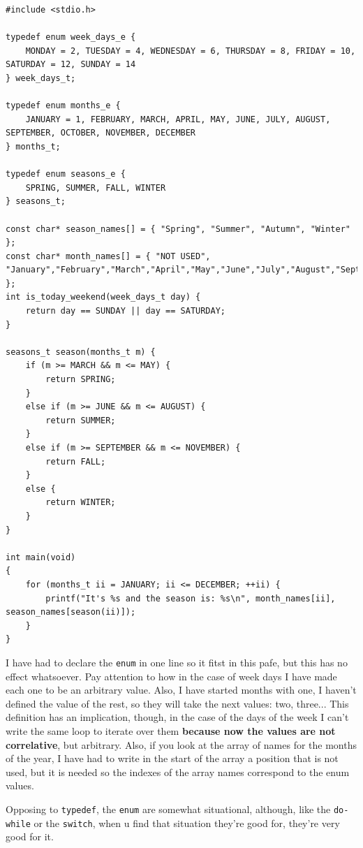 \documentclass[a4paper]{article}
\begin{document}
\noindent
\begin{minipage}[H]{\linewidth}
\mbox{}
\begin{lstlisting}[style=C,
caption={Ejemplo final de enumerados},
label={lst:finalEnums}]
#include <stdio.h>

typedef enum week_days_e {
    MONDAY = 2, TUESDAY = 4, WEDNESDAY = 6, THURSDAY = 8, FRIDAY = 10, SATURDAY = 12, SUNDAY = 14
} week_days_t;

typedef enum months_e {
    JANUARY = 1, FEBRUARY, MARCH, APRIL, MAY, JUNE, JULY, AUGUST, SEPTEMBER, OCTOBER, NOVEMBER, DECEMBER
} months_t;

typedef enum seasons_e {
    SPRING, SUMMER, FALL, WINTER
} seasons_t;

const char* season_names[] = { "Spring", "Summer", "Autumn", "Winter" };
const char* month_names[] = { "NOT USED", "January","February","March","April","May","June","July","August","September","October","November","December" };
int is_today_weekend(week_days_t day) {
    return day == SUNDAY || day == SATURDAY;
}

seasons_t season(months_t m) {
    if (m >= MARCH && m <= MAY) {
        return SPRING;
    }
    else if (m >= JUNE && m <= AUGUST) {
        return SUMMER;
    }
    else if (m >= SEPTEMBER && m <= NOVEMBER) {
        return FALL;
    }
    else {
        return WINTER;
    }
}

int main(void)
{
    for (months_t ii = JANUARY; ii <= DECEMBER; ++ii) {
        printf("It's %s and the season is: %s\n", month_names[ii], season_names[season(ii)]);
    }
}
\end{lstlisting}
\end{minipage}

I have had to declare the \verb!enum! in one line so it fitst in this pafe, but
this has no effect whatsoever. Pay attention to how in the case of week days I
have made each one to be an arbitrary value. Also, I have started months with
one, I haven't defined the value of the rest, so they will take the next values:
two, three... This definition has an implication, though, in the case of the
days of the week I can't write the same loop to iterate over them
\textbf{because now the values are not correlative}, but arbitrary. Also, if you
look at the array of names for the months of the year, I have had to write in
the start of the array a position that is not used, but it is needed so the
indexes of the array names correspond to the enum values.

Opposing to \verb!typedef!, the \verb!enum! are somewhat situational, although,
like the \verb!do-while! or the \verb!switch!, when u find that situation
they're good for, they're very good for it.
\end{document}
